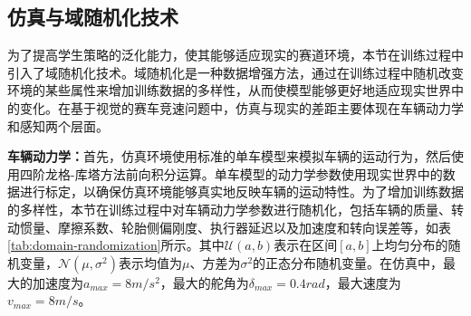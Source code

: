 \subsection{仿真与域随机化技术}
为了提高学生策略的泛化能力，使其能够适应现实的赛道环境，本节在训练过程中引入了域随机化技术。域随机化是一种数据增强方法，通过在训练过程中随机改变环境的某些属性来增加训练数据的多样性，从而使模型能够更好地适应现实世界中的变化\cite{tobin2017domain, peng2018sim}。在基于视觉的赛车竞速问题中，仿真与现实的差距主要体现在车辆动力学和感知两个层面。

\textbf{车辆动力学：}首先，仿真环境使用标准的单车模型\cite{liniger2015optimization}来模拟车辆的运动行为，然后使用四阶龙格-库塔方法前向积分运算。单车模型的动力学参数使用现实世界中的数据进行标定，以确保仿真环境能够真实地反映车辆的运动特性。为了增加训练数据的多样性，本节在训练过程中对车辆动力学参数进行随机化，包括车辆的质量、转动惯量、摩擦系数、轮胎侧偏刚度、执行器延迟以及加速度和转向误差等，如表\ref{tab:domain-randomization}所示。其中$\mathcal{U}(a,b)$表示在区间$[a,b]$上均匀分布的随机变量，$\mathcal{N}(\mu,\sigma^2)$表示均值为$\mu$、方差为$\sigma^2$的正态分布随机变量。在仿真中，最大的加速度为$a_{max}=8m/s^2$，最大的舵角为$\delta_{max}=0.4rad$，最大速度为$v_{max}=8m/s$。


